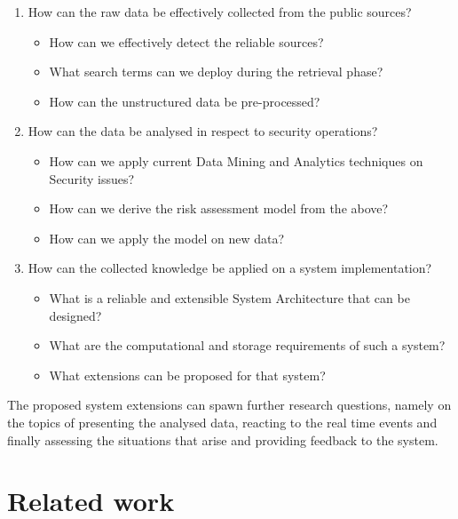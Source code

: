 \documentclass[12pt]{article}
\begin{document}
\begin{enumerate}
	\item How can the raw data be effectively collected from the public sources? 
	\begin{itemize}
		\item How can we effectively detect the reliable sources?
		\item What search terms can we deploy during the retrieval phase?
		\item How can the unstructured data be pre-processed? 
	\end{itemize}
	\item How can the data be analysed in respect to security operations?
	\begin{itemize}
		\item How can we apply current Data Mining and Analytics techniques on Security issues?
		\item How can we derive the risk assessment model from the above?
		\item How can we apply the model on new data?
	\end{itemize}
	\item	How can the collected knowledge be applied on a system implementation?
	\begin{itemize}
		\item What is a reliable and extensible System Architecture that can be designed?
		\item What are the computational and storage requirements of such a system?
		\item What extensions can be proposed for that system?
	\end{itemize}
\end{enumerate}

The proposed system extensions can spawn further research questions, namely on the topics of presenting the analysed data, reacting to the real time events and finally assessing the situations that arise and providing feedback to the system.


\section{Related work}
\end{document}
